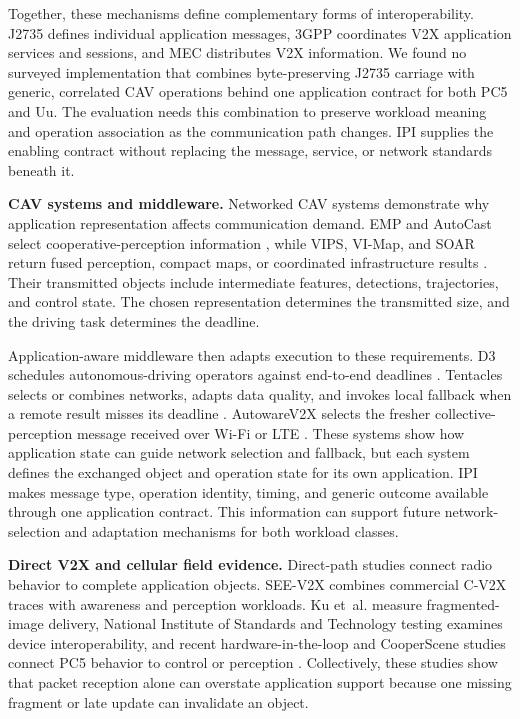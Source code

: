Together, these mechanisms define complementary forms of interoperability.
J2735 defines individual application messages, 3GPP coordinates V2X application
services and sessions, and MEC distributes V2X information. We found no surveyed
implementation that combines byte-preserving J2735 carriage with generic,
correlated CAV operations behind one application contract for both PC5 and Uu.
The evaluation needs this combination to preserve workload meaning and operation
association as the communication path changes. IPI supplies the enabling
contract without replacing the message, service, or network standards beneath
it.

\textbf{CAV systems and middleware.}
Networked CAV systems demonstrate why application representation affects
communication demand. EMP and AutoCast select cooperative-perception
information \cite{zhang2021emp,qiu2022autocast}, while VIPS, VI-Map, and SOAR
return fused perception, compact maps, or coordinated infrastructure results
\cite{shi2022vips,he2023vimap,shi2024soar}. Their transmitted objects include
intermediate features, detections, trajectories, and control state. The chosen
representation determines the transmitted size, and the driving task determines
the deadline.

Application-aware middleware then adapts execution to these requirements. D3
schedules autonomous-driving operators against end-to-end deadlines
\cite{gog2022d3}. Tentacles selects or combines networks, adapts data quality,
and invokes local fallback when a remote result misses its deadline
\cite{wu2024tentacles}. AutowareV2X selects the fresher collective-perception
message received over Wi-Fi or LTE \cite{asabe2024autowarev2x}. These systems
show how application state can guide network selection and fallback, but each
system defines the exchanged object and operation state for its own application.
IPI makes message type, operation identity, timing, and generic outcome
available through one application contract. This information can support future
network-selection and adaptation mechanisms for both workload classes.

\textbf{Direct V2X and cellular field evidence.}
Direct-path studies connect radio behavior to complete application objects.
SEE-V2X combines commercial C-V2X traces with awareness and perception
workloads. Ku et~al. measure fragmented-image delivery, National Institute of
Standards and Technology testing examines device interoperability, and recent
hardware-in-the-loop and CooperScene studies connect PC5 behavior to control or
perception
\cite{mo2025seev2x,ku2022adaptive,song2024nist,zhan2026hil,wu2026cooperscene}.
Collectively, these studies show that packet reception alone can overstate
application support because one missing fragment or late update can invalidate
an object.

